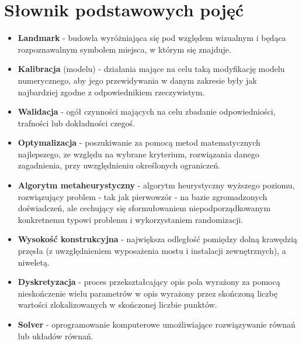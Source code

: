 \chapter*{Słownik podstawowych pojęć}
\begin{itemize}[label = {},leftmargin=*]
\item \textbf{Landmark} - budowla wyróżniająca się pod względem wizualnym i będąca rozpoznawalnym symbolem miejsca, w którym się znajduje.
\item \textbf{Kalibracja} (modelu) - działania mające na celu taką modyfikację modelu numerycznego, aby jego przewidywania w danym zakresie były jak najbardziej zgodne z odpowiednikiem rzeczywistym.
\item \textbf{Walidacja} - ogół czynności mających na celu zbadanie odpowiedniości, trafności lub dokładności czegoś.
\item \textbf{Optymalizacja} - poszukiwanie za pomocą metod matematycznych najlepszego, ze względu na wybrane kryterium, rozwiązania danego zagadnienia, przy uwzględnieniu określonych ograniczeń.
\item \textbf{Algorytm metaheurystyczny} - algorytm heurystyczny wyższego poziomu, rozwiązujący problem - tak jak pierwowzór - na bazie zgromadzonych doświadczeń, ale cechujący się sformułowaniem niepodporządkowanym konkretnemu typowi problemu i wykorzystaniem randomizacji. 
\item \textbf{Wysokość konstrukcyjna} - największa odległość pomiędzy dolną krawędzią przęsła (z uwzględnieniem wyposażenia mostu i instalacji zewnętrznych), a niweletą.
\item \textbf{Dyskretyzacja} - proces przekształcający opis pola wyrażony za pomocą nieskończenie wielu parametrów w opis wyrażony przez skończoną liczbę wartości zlokalizowanych w skończonej liczbie punktów.
\item \textbf{Solver} - oprogramowanie komputerowe umożliwiające rozwiązywanie równań lub układów równań.
\end{itemize}